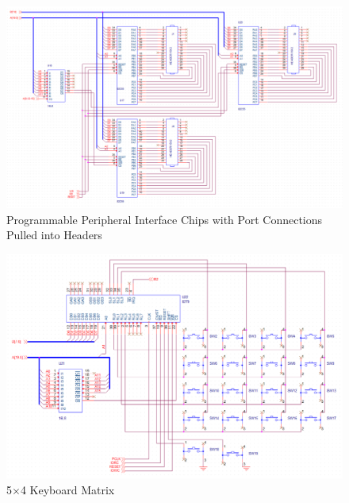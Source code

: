         \begin{figure}[ht]
            \begin{center}
                \includegraphics[width=1\textwidth]{figures/schematics/ppi.png}
                \caption{Programmable Peripheral Interface Chips with Port Connections Pulled into Headers} \label{fig:page5}
            \end{center}
        \end{figure}

        \begin{figure}[ht]
            \begin{center}
                \includegraphics[width=1\textwidth]{figures/schematics/keyboard.png}
                \caption{5$\times$4 Keyboard Matrix} \label{fig:page6}
            \end{center}
        \end{figure}

